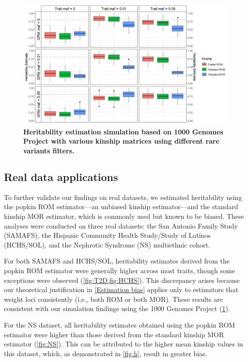 \documentclass[11pt]{article}
\begin{document}
\begin{figure}[bp!]
  \centering
  \includegraphics[width=\textwidth]{data/tgp_sim.png}
  \caption{
    {\bf Heritability estimation simulation based on 1000 Genomes Project with various kinship matrices using different rare variants filters.}
    }
  \label{fig:tgp_sim}
\end{figure}


\subsection{Real data applications}
To further validate our findings on real datasets, we estimated heritability using the popkin ROM estimator—an unbiased kinship estimator—and the standard kinship MOR estimator, which is commonly used but known to be biased. These analyses were conducted on three real datasets: the San Antonio Family Study (SAMAFS), the Hispanic Community Health Study/Study of Latinos (HCHS/SOL), and the Nephrotic Syndrome (NS) multiethnic cohort.

For both SAMAFS and HCHS/SOL, heritability estimates derived from the popkin ROM estimator were generally higher across most traits, though some exceptions were observed (\cref{fig:T2D,fig:HCHS}). This discrepancy arises because our theoretical justification in \ref{Estimation bias} applies only to estimators that weight loci consistently (i.e., both ROM or both MOR). These results are consistent with our simulation findings using the 1000 Genomes Project (\cref{fig:tgp_sim}). 

For the NS dataset, all heritability estimates obtained using the popkin ROM estimator were higher than those derived from the standard kinship MOR estimator (\cref{fig:NS}). This can be attributed to the higher mean kinship values in this dataset, which, as demonstrated in \cref{fig:h}, result in greater bias.
\end{document}
